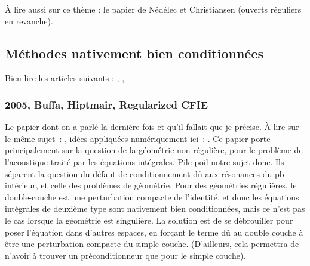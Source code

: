 \documentclass[11pt,a4paper]{article}
\begin{document}
À lire aussi sur ce thème : \cite{christiansen2002preconditioner} le papier de Nédélec et Christiansen (ouverts réguliers en revanche).  

\subsection{Méthodes nativement bien conditionnées}

Bien lire les articles suivants : \cite{antoine2007generalized}, \cite{antoine2005alternative}, 

\subsubsection{2005, Buffa, Hiptmair, Regularized CFIE \cite{buffa2005regularized} }

Le papier dont on a parlé la dernière fois et qu'il fallait que je précise. 
À lire sur le même sujet~: \cite{buffa2006acoustic}, idées appliquées numériquement ici~: \cite{buffa2004coercive}. 
Ce papier porte principalement sur la question de la géométrie non-régulière, pour le problème de l'acoustique traité par les équations intégrales. Pile poil notre sujet donc. Ils séparent la question du défaut de conditionnement dû aux résonances du pb intérieur, et celle des problèmes de géométrie. Pour des géométries régulières, le double-couche est une perturbation compacte de l'identité, et donc les équations intégrales de deuxième type sont nativement bien conditionnées, mais ce n'est pas le cas lorsque la géométrie est singulière. La solution est de se débrouiller pour poser l'équation dans d'autres espaces, en forçant le terme dû au double couche à être une perturbation compacte du simple couche. (D'ailleurs, cela permettra de n'avoir à trouver un préconditionneur que pour le simple couche). 
\end{document}
